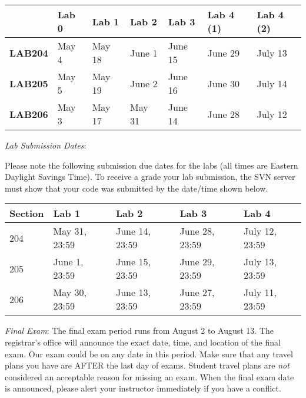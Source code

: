 \documentclass[letterpaper,10pt]{article}
\begin{document}
\begin{center}	
	\begin{tabular}{l|l l l l l l}
		 & \textbf{Lab 0} & \textbf{Lab 1} & \textbf{Lab 2} & \textbf{Lab 3} & \textbf{Lab 4 (1)} & \textbf{Lab 4 (2)} 		\\
		 \hline
		\textbf{LAB204} & May 4 & May 18 & June 1 & June 15 & June 29 & July 13 	\\
		\hline
		\textbf{LAB205} & May 5 & May 19 & June 2 & June 16 & June 30 & July 14	\\
		\hline
		\textbf{LAB206} & May 3 & May 17 & May 31 & June 14 & June 28 & July 12  \\
	\end{tabular}	
	\end{center}

\newpage

\textit{Lab Submission Dates}:

Please note the following submission due dates for the labs (all times are Eastern Daylight Savings Time). To receive a grade your lab submission, the SVN server must show that your code was submitted by the date/time shown below. \\

\begin{table}[H]
        \begin{center}
        \begin{tabular}{l|l|l|l|l}
        	\textbf{Section} & \textbf{Lab 1} & \textbf{Lab 2} & \textbf{Lab 3} & \textbf{Lab 4} \\
			\hline
			204 & May 31, 23:59 & June 14, 23:59 & June 28, 23:59 & July 12, 23:59 \\
			\hline
			205 & June 1, 23:59 & June 15, 23:59 & June 29, 23:59 & July 13, 23:59 \\
			\hline
			206 & May 30, 23:59 & June 13, 23:59 & June 27, 23:59 & July 11, 23:59 \\
        \end{tabular}
        \end{center}
\end{table}

\textit{Final Exam}: The final exam period runs from August 2 to August 13. The registrar's office will announce the exact date, time, and location of the final exam. Our exam could be on any date in this period. Make sure that any travel plans you have are AFTER the last day of exams. Student travel plans are \emph{not} considered an acceptable reason for missing an exam. When the final exam date is announced, please alert your instructor immediately if you have a conflict.
\end{document}
